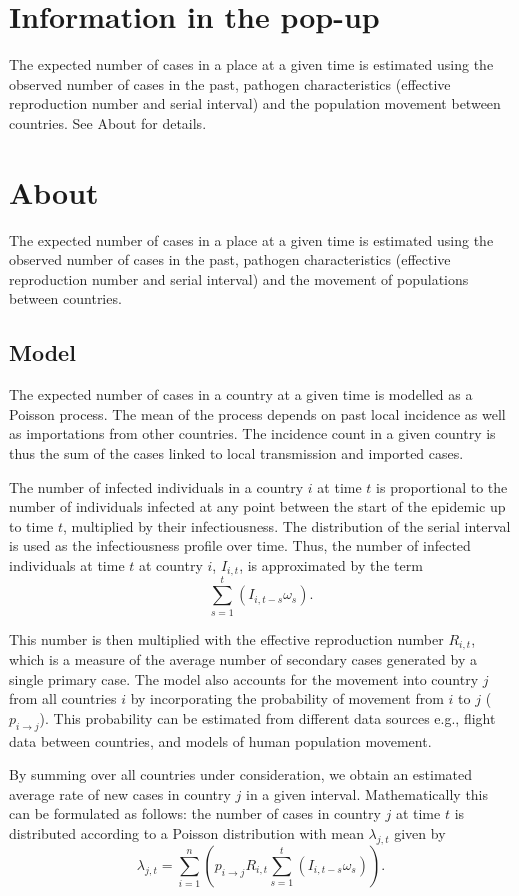 \documentclass[a4paper,12pt]{article}
\begin{document}
\section{Information in the pop-up}
The expected number of cases in a place at a given time is estimated
using the observed number of cases in the past, pathogen characteristics (effective reproduction number
and serial interval) and the population movement between
countries. See About for details.

\section{About}

The expected number of cases in a place at a given time is estimated
using the observed number of cases in the past, pathogen characteristics (effective reproduction number
and serial interval) and the movement of populations between
countries.
\subsection*{Model}
The expected number of cases in a country at a given time is modelled as
a Poisson process. The mean of the process depends on past local incidence
as well as importations from other countries. The incidence count in a
given country is thus the sum of the cases linked to local
transmission and imported cases.

The number of infected individuals in a country $i$ at time $t$ is proportional
to the number of individuals infected at any point between the start
of the epidemic up to time $t$, multiplied by their
infectiousness. The distribution of the serial interval is used as the
infectiousness profile over time.
Thus, the number of infected individuals at time $t$
at country $i$, $I_{i, t}$, is approximated by the term
\[
  \sum_{s = 1}^{t}{\left( I_{i, t-s} \omega_s\right)}.
  \]

This number is then multiplied with the effective
reproduction number $R_{i, t}$, which is a measure of the
average number of secondary cases generated by a single primary
case.
The model also accounts for the movement into country $j$
from all countries $i$ by incorporating the probability of movement
from $i$ to $j$ ($p_{i \rightarrow j}$). This probability can be
estimated from different data sources e.g., flight data between
countries, and models of human population movement.

By summing over all countries under consideration,  we obtain an
estimated average rate of new cases in country $j$ in a given interval. Mathematically
this can be formulated as follows: the number of cases in country $j$ at time $t$ is
distributed according to a Poisson distribution with mean $\lambda_{j,
  t}$ given by
\[
  \lambda_{j, t} = \sum_{i = 1}^{n}{\left( p_{i \rightarrow j}R_{i,
        t}\sum_{s = 1}^{t}{\left( I_{i, t-s} \omega_s\right)}
    \right)}.
\]
\end{document}
